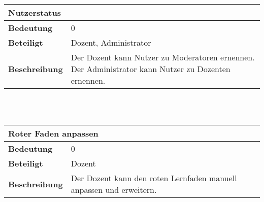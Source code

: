 \documentclass[12pt,a4paper]{article}
\begin{document}
\begin{tabular}{l p{10cm}}
\multicolumn{2}{l}{\textbf{Nutzerstatus}} \\ \hline
\textbf{Bedeutung} & 0 \\ \hline 
\textbf{Beteiligt} & Dozent, Administrator \\ \hline 
\textbf{Beschreibung} & Der Dozent kann Nutzer zu Moderatoren ernennen. Der Administrator kann Nutzer zu Dozenten ernennen.\\ 
\hline 
\end{tabular}\\\\

\begin{tabular}{l p{10cm}}
\multicolumn{2}{l}{\textbf{Roter Faden anpassen}} \\ \hline
\textbf{Bedeutung} & 0 \\ \hline 
\textbf{Beteiligt} & Dozent \\ \hline 
\textbf{Beschreibung} & Der Dozent kann den roten Lernfaden manuell anpassen und erweitern.\\ 
\hline 
\end{tabular}\\\\
\end{document}
